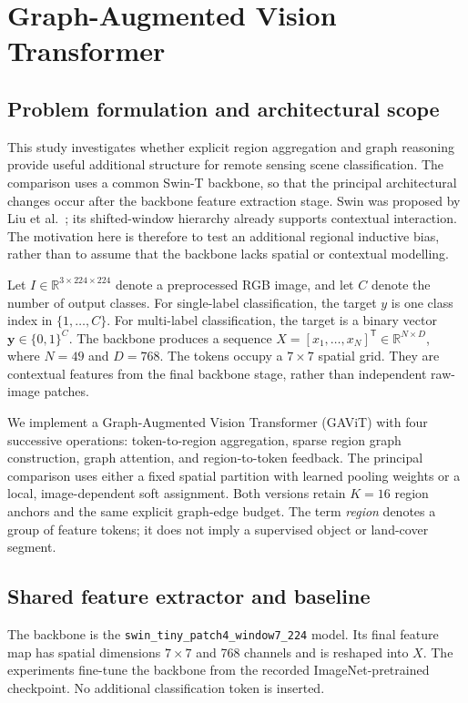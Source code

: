 \chapter{Graph-Augmented Vision Transformer}
\label{chap:method}

\section{Problem formulation and architectural scope}

This study investigates whether explicit region aggregation and graph reasoning
provide useful additional structure for remote sensing scene classification.
The comparison uses a common Swin-T backbone, so that the principal architectural
changes occur after the backbone feature extraction stage. Swin was proposed by
Liu et al.~\cite{liu2021swin}; its shifted-window hierarchy already supports
contextual interaction. The motivation here is therefore to test an additional
regional inductive bias, rather than to assume that the backbone lacks spatial
or contextual modelling.

Let $I\in\mathbb{R}^{3\times224\times224}$ denote a preprocessed RGB image, and
let $C$ denote the number of output classes. For single-label classification,
the target $y$ is one class index in $\{1,\ldots,C\}$. For multi-label
classification, the target is a binary vector
$\boldsymbol{y}\in\{0,1\}^{C}$. The backbone produces a sequence
$X=[x_1,\ldots,x_N]^{\mathsf T}\in\mathbb{R}^{N\times D}$, where $N=49$
and $D=768$. The tokens occupy a $7\times7$ spatial grid. They are contextual
features from the final backbone stage, rather than independent raw-image
patches.

We implement a Graph-Augmented Vision Transformer (GAViT) with four successive
operations: token-to-region aggregation, sparse region graph construction,
graph attention, and region-to-token feedback. The principal comparison uses
either a fixed spatial partition with learned pooling weights or a local,
image-dependent soft assignment. Both versions retain $K=16$ region anchors
and the same explicit graph-edge budget. The term \emph{region} denotes a group
of feature tokens; it does not imply a supervised object or land-cover segment.

\section{Shared feature extractor and baseline}

The backbone is the \texttt{swin\_tiny\_patch4\_window7\_224} model.
Its final feature map has spatial dimensions $7\times7$ and 768 channels and
is reshaped into $X$. The experiments fine-tune the backbone from the recorded
ImageNet-pretrained checkpoint. No additional classification token is inserted.

